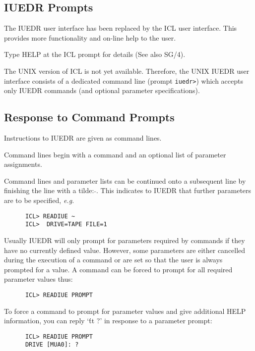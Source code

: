 \subsection {IUEDR Prompts}

The IUEDR user interface has been replaced by the ICL user interface.
This provides more functionality and on-line help to the user.

Type HELP at the ICL prompt for details (See also SG/4).

The UNIX version of ICL is not yet available. Therefore, the UNIX
IUEDR user interface consists of a dedicated command line (prompt
\verb+iuedr>+) which accepts only IUEDR commands (and optional
parameter specifications).

\subsection {Response to Command Prompts}

Instructions to IUEDR are given as  command lines.

Command lines begin with a command and an optional list of parameter
assignments.

Command lines and parameter lists can be continued onto a subsequent
line by finishing the line with a tilde: \(\tilde{ }\). This indicates
to IUEDR that further parameters are to be specified, {\em e.g.}

\begin{verbatim}
      ICL> READIUE ~
      ICL>  DRIVE=TAPE FILE=1
\end{verbatim}

Usually IUEDR will only prompt for parameters required by commands if
they have no currently defined value. However, some parameters are
either cancelled during the execution of a command or are set so that
the user is always prompted for a value. A command can be forced to
prompt for all required parameter values thus:

\begin{verbatim}
      ICL> READIUE PROMPT
\end{verbatim}

To force a command to prompt for parameter values and give additional
HELP information, you can reply `{\'tt ?}' in response to a parameter
prompt:

\begin{verbatim}
      ICL> READIUE PROMPT
      DRIVE [MUA0]: ?
\end{verbatim}

